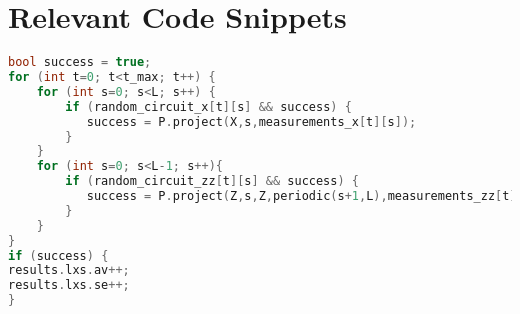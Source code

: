 \chapter{Relevant Code Snippets}
\label{ch:apdx-code}

\lstset{style=myStyle}

\begin{lstlisting}[caption=Computation of the linear cross entropy for one
  measurement history of a circuit, label={lst:lxe-cpp}, language=C++]
bool success = true; 
for (int t=0; t<t_max; t++) {
    for (int s=0; s<L; s++) {
        if (random_circuit_x[t][s] && success) {
           success = P.project(X,s,measurements_x[t][s]);
        }
    }
    for (int s=0; s<L-1; s++){
        if (random_circuit_zz[t][s] && success) {
           success = P.project(Z,s,Z,periodic(s+1,L),measurements_zz[t][s]);
        }
    }
}
if (success) {
results.lxs.av++;
results.lxs.se++;
}
\end{lstlisting}
